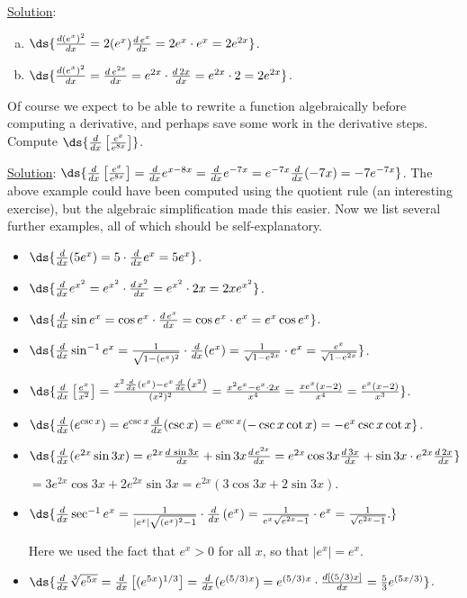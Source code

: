 \underline{Solution}:
\begin{enumerate}[(a)]
\item $\ds{\frac{d(e^x)^2}{dx}=2(e^x)\frac{d\,e^x}{dx}=2e^x\cdot e^x=2e^{2x}}$.
\item $\ds{\frac{d(e^x)^2}{dx}=\frac{d\,e^{2x}}{dx}
          =e^{2x}\cdot\frac{d\,2x}{dx}=e^{2x}\cdot2=2e^{2x}}$.
\end{enumerate}
\eex
Of course we expect to be able to rewrite a function algebraically 
before computing a derivative, and perhaps save some work
in the derivative steps.
\bex Compute $\ds{\frac{d}{dx}\left[\frac{e^x}{e^{8x}}\right]}$.

\underline{Solution}:
$\ds{\frac{d}{dx}\left[\frac{e^x}{e^{8x}}\right]
 =\frac{d}{dx}e^{x-8x}=\frac{d}{dx}e^{-7x}
 =e^{-7x}\frac{d}{dx}(-7x)=-7e^{-7x}}$.
\eex
The above example could have been computed using the
quotient rule (an interesting exercise), but the 
algebraic simplification made this easier.
Now we list several further examples, all of which should
be self-explanatory.
\begin{itemize}
\item $\ds{\frac{d}{dx}(5e^x)=5\cdot\frac{d}{dx}e^x=5e^x}$.
\item $\ds{\frac{d}{dx}e^{x^2}=e^{x^2}\cdot\frac{d\,x^2}{dx}
             =e^{x^2}\cdot2x=2xe^{x^2}}$.
\item $\ds{\frac{d}{dx}\sin e^x=\cos e^x\cdot\frac{d\,e^x}{dx}
             =\cos e^x\cdot e^x=e^x\cos e^x}$.
\item $\ds{\frac{d}{dx}\sin^{-1}e^x=\frac{1}{\sqrt{1-(e^x)^2}}
              \cdot\frac{d}{dx}(e^x)=\frac1{\sqrt{1-e^{2x}}}\cdot e^x
               =\frac{e^x}{\sqrt{1-e^{2x}}}}$.
\item $\ds{\frac{d}{dx}\left[\frac{e^x}{x^2}\right]
              =\frac{x^2\frac{d}{dx}\left(e^x\right)
                       -e^x\frac{d}{dx}\left(x^2\right)}{(x^2)^2}
              =\frac{x^2e^x-e^x\cdot2x}{x^4}
              =\frac{xe^x(x-2)}{x^4}=\frac{e^x(x-2)}{x^3}}$.
\item $\ds{\frac{d}{dx}(e^{\csc x})
              =e^{\csc x}\frac{d}{dx}(\csc x)
              =e^{\csc x}(-\csc x\cot x)
              =-e^x\csc x\cot x}$.
\item $\ds{\frac{d}{dx}(e^{2x}\sin3x)
              =e^{2x}\frac{d\,\sin3x}{dx}+\sin3x\frac{d\,e^{2x}}{dx}
              =e^{2x}\cos 3x\frac{d\,3x}{dx}+\sin3x\cdot e^{2x}\frac{d\,2x}{dx}
              }$

              \qquad\qquad 
              $=3e^{2x}\cos3x+2e^{2x}\sin3x=e^{2x}(3\cos3x+2\sin3x).$
\item $\ds{\frac{d}{dx}\sec^{-1}e^x
         =\frac1{|e^x|\sqrt{(e^x)^2-1}}\cdot\frac{d}{dx}\left(e^x\right)
         =\frac1{{e^x}\sqrt{e^{2x}-1}}\cdot e^x
         =\frac1{\sqrt{e^{2x}-1}}.}$

Here we used the fact that $e^x>0$ for all $x$, so that $|e^x|=e^x$.
\item $\ds{\frac{d}{dx}\sqrt[3]{e^{5x}}
              =\frac{d}{dx}\left[(e^{5x})^{1/3}\right]
              =\frac{d}{dx}(e^{(5/3)x})
              =e^{(5/3)x}\cdot\frac{d[(5/3)x]}{dx}
              =\frac53e^{(5x/3)}}$.
\end{itemize}
